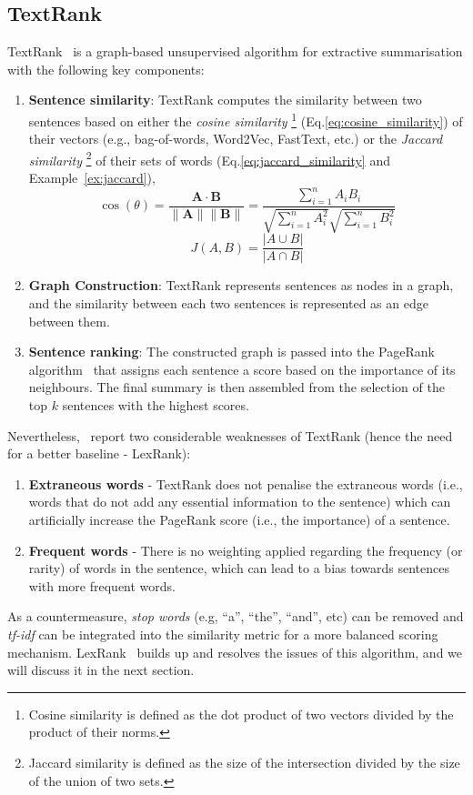 \subsection{TextRank}\label{subsec:textrank}
TextRank~\cite{mihalcea-tarau-2004-textrank} is a graph-based unsupervised algorithm for extractive summarisation with the following key components:
\begin{enumerate}
    \item \textbf{Sentence similarity}: TextRank computes the similarity between two sentences based on either the \emph{cosine similarity}
        \footnote{
            Cosine similarity is defined as the dot product of two vectors divided by the product of their norms.
        } (Eq.\ref{eq:cosine_similarity}) of their vectors (e.g., bag-of-words, Word2Vec, FastText, etc.) or the \emph{Jaccard similarity}
        \footnote{
            Jaccard similarity is defined as the size of the intersection divided by the size of the union of two sets.
        } of their sets of words (Eq.\ref{eq:jaccard_similarity} and Example~\ref{ex:jaccard}),
    \begin{equation}\label{eq:cosine_similarity}
        \cos(\theta) = \frac{\mathbf{A} \cdot \mathbf{B}}{\|\mathbf{A}\| \|\mathbf{B}\|} = \frac{\sum_{i=1}^{n} A_i B_i}{\sqrt{\sum_{i=1}^{n} A_i^2} \sqrt{\sum_{i=1}^{n} B_i^2}}
    \end{equation}
    \begin{equation}\label{eq:jaccard_similarity}
        J(A,B)= \frac{|A\cup B|}{|A\cap B|}
    \end{equation}
    \item \textbf{Graph Construction}: TextRank represents sentences as nodes in a graph, and the similarity between each two sentences is represented as an edge between them.
    \item \textbf{Sentence ranking}: The constructed graph is passed into the PageRank algorithm~\cite{page1998anatomy} that assigns each sentence a score based on the importance of its neighbours.
    The final summary is then assembled from the selection of the top $k$ sentences with the highest scores.
\end{enumerate}
Nevertheless,~\cite{Shearing2020AutomatedTS} report two considerable weaknesses of TextRank (hence the need for a better baseline - LexRank):
\begin{enumerate}
    \item \textbf{Extraneous words} - TextRank does not penalise the extraneous words (i.e., words that do not add any essential information to the sentence) which can artificially increase the PageRank score (i.e., the importance) of a sentence.
    \item \textbf{Frequent words} - There is no weighting applied regarding the frequency (or rarity) of words in the sentence, which can lead to a bias towards sentences with more frequent words.
\end{enumerate}
As a countermeasure, \emph{stop words} (e.g, ``a'', ``the'', ``and'', etc) can be removed and \emph{tf-idf} can be integrated into the similarity metric for a more balanced scoring mechanism.
LexRank~\cite{Erkan2004LexRankGC} builds up and resolves the issues of this algorithm, and we will discuss it in the next section.

